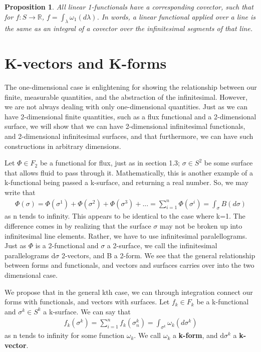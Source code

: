 \documentclass{book}
\newtheorem{prop}[equation]{Proposition}
\begin{document}
\begin{prop}
	All linear 1-functionals have a corresponding covector, such that for $f : S \to \mathbb{R}$, $f = \int_{\lambda} \omega_1(d\lambda)$. In words, a linear functional applied over a line is the same as an integral of a covector over the infinitesimal segments of that line. 
\end{prop}




\section{K-vectors and K-forms}



The one-dimensional case is enlightening for showing the relationship between our finite, measurable quantities, and the abstraction of the infinitesimal. However, we are not always dealing with only one-dimensional quantities. Just as we can have 2-dimensional finite quantities, such as a flux functional and a 2-dimensional surface, we will show that we can have 2-dimensional infinitesimal functionals, and 2-dimensional infinitesimal surfaces, and that furthermore, we can have such constructions in arbitrary dimensions. 

Let $\Phi \in F_2$ be a functional for flux, just as in section 1.3; $\sigma \in S^2$ be some surface that allows fluid to pass through it. Mathematically, this is another example of a k-functional being passed a k-surface, and returning a real number. So, we may write that \begin{gather}\Phi(\sigma) = \Phi(\sigma^1) + \Phi(\sigma^2) + \Phi(\sigma^3) + ... = \sum_{i=1}^n \Phi(\sigma^i) = \int_\sigma B(d\sigma)\end{gather} as n tends to infinity. This appears to be identical to the case where k=1. The difference comes in by realizing that the surface $\sigma$ may not be broken up into infinitesimal line elements. Rather, we have to use infinitesimal paralellograms. Just as $\Phi$ is a 2-functional and $\sigma$ a 2-surface, we call the infinitesimal parallelograms d$\sigma$ 2-vectors, and B a 2-form. We see that the general relationship between forms and functionals, and vectors and surfaces carries over into the two dimensional case.  


We propose that in the general kth case, we can through integration connect our forms with functionals, and vectors with surfaces. Let $f_k \in F_k$ be a k-functional and $\sigma^k \in S^k$ a k-surface. We can say that \begin{gather}f_k(\sigma^k) = \sum_{i=1}^n f_k(\sigma^k_n) = \int_{\sigma^k} \omega_k(d\sigma^k)\end{gather} as n tends to infinity for some function $\omega_k$. We call $\omega_k$ a \textbf{k-form}, and d$\sigma^k$ a \textbf{k-vector}. 
\end{document}
